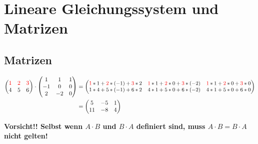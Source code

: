 \documentclass{article}
\begin{document}
\setcounter{section}{2}
\section{Lineare Gleichungssystem und Matrizen}

\setcounter{subsection}{1}
\subsection{Matrizen}

\begin{align*}
  \begin{pmatrix}
    \textcolor{red}{1} & \textcolor{red}{2} & \textcolor{red}{3} \\
    4 & 5 & 6 \\
  \end{pmatrix}
  \cdot
  \begin{pmatrix}
    1  & 1  & 1 \\
    -1 & 0  & 0 \\
    2  & -2 & 0 \\
  \end{pmatrix}
  &=
  \begin{small}      
    \begin{pmatrix}
      \textcolor{red}{1} * 1 + \textcolor{red}{2} * (-1) + \textcolor{red}{3} * 2 &
      \textcolor{red}{1} * 1 + \textcolor{red}{2} * 0 + \textcolor{red}{3} * (-2) &
      \textcolor{red}{1} * 1 + \textcolor{red}{2} * 0 + \textcolor{red}{3} * 0 \\
      1 * 4 + 5 * (-1) + 6 * 2 & 4 * 1 + 5 * 0 + 6 * (-2) & 4 * 1 + 5 * 0 + 6 * 0 \\
    \end{pmatrix}
  \end{small}\\
  &=
  \begin{pmatrix}
    5  & -5 & 1 \\
    11 & -8 & 4 \\
  \end{pmatrix}
\end{align*}

\textbf{Vorsicht!! Selbst wenn $A \cdot B$ und $B \cdot A$ definiert sind, muss $A \cdot B = B \cdot A$
nicht gelten!}
\end{document}
